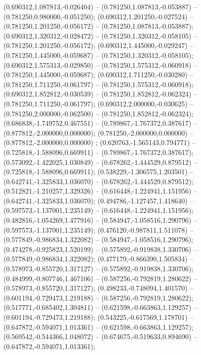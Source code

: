  (0.690312,1.087813,-0.026404) -- (0.781250,1.087813,-0.053887) -- (0.781250,0.980000,-0.051250);
 (0.690312,1.201250,-0.027524) -- (0.781250,1.201250,-0.056172) -- (0.781250,1.087813,-0.053887);
 (0.690312,1.320312,-0.028472) -- (0.781250,1.320312,-0.058105) -- (0.781250,1.201250,-0.056172);
 (0.690312,1.445000,-0.029247) -- (0.781250,1.445000,-0.059687) -- (0.781250,1.320312,-0.058105);
 (0.690312,1.575313,-0.029850) -- (0.781250,1.575312,-0.060918) -- (0.781250,1.445000,-0.059687);
 (0.690312,1.711250,-0.030280) -- (0.781250,1.711250,-0.061797) -- (0.781250,1.575312,-0.060918);
 (0.690312,1.852812,-0.030539) -- (0.781250,1.852812,-0.062324) -- (0.781250,1.711250,-0.061797);
 (0.690312,2.000000,-0.030625) -- (0.781250,2.000000,-0.062500) -- (0.781250,1.852812,-0.062324);
 (0.686838,-1.749752,0.467551) -- (0.789867,-1.767372,0.387617) -- (0.877812,-2.000000,0.000000);
 (0.781250,-2.000000,0.000000) -- (0.877812,-2.000000,0.000000) ;
 (0.620763,-1.565143,0.794771) -- (0.725818,-1.588096,0.669911) -- (0.789867,-1.767372,0.387617);
 (0.573092,-1.422025,1.030849) -- (0.678262,-1.444529,0.879512) -- (0.725818,-1.588096,0.669911);
 (0.538229,-1.306575,1.203501) -- (0.642741,-1.325833,1.036070) -- (0.678262,-1.444529,0.879512);
 (0.512821,-1.210257,1.329326) -- (0.616448,-1.224941,1.151956) -- (0.642741,-1.325833,1.036070);
 (0.494786,-1.127457,1.418640) -- (0.597573,-1.137001,1.235149) -- (0.616448,-1.224941,1.151956);
 (0.482816,-1.054269,1.477916) -- (0.584947,-1.058516,1.290796) -- (0.597573,-1.137001,1.235149);
 (0.476120,-0.987811,1.511078) -- (0.577849,-0.986834,1.322082) -- (0.584947,-1.058516,1.290796);
 (0.474278,-0.925823,1.520199) -- (0.575892,-0.919838,1.330706) -- (0.577849,-0.986834,1.322082);
 (0.477179,-0.866390,1.505834) -- (0.578973,-0.855720,1.317127) -- (0.575892,-0.919838,1.330706);
 (0.484999,-0.807746,1.467106) -- (0.587256,-0.792819,1.280622) -- (0.578973,-0.855720,1.317127);
 (0.498233,-0.748094,1.401570) -- (0.601194,-0.729473,1.219188) -- (0.587256,-0.792819,1.280622);
 (0.517771,-0.685402,1.304811) -- (0.621598,-0.663863,1.129257) -- (0.601194,-0.729473,1.219188);
 (0.543225,-0.617569,1.178701) -- (0.647872,-0.594071,1.013361) -- (0.621598,-0.663863,1.129257);
 (0.569542,-0.544366,1.048072) -- (0.674675,-0.519633,0.894690) -- (0.647872,-0.594071,1.013361);
